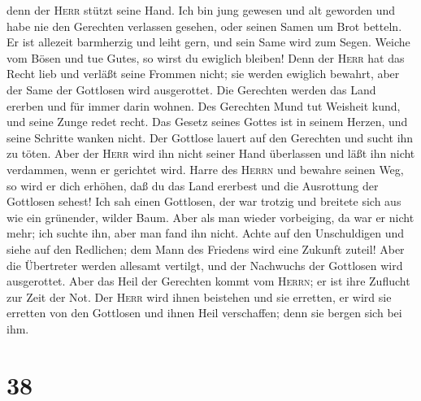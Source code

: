 denn der \textsc{Herr} stützt seine Hand.  Ich bin jung
gewesen und alt geworden und habe nie den Gerechten verlassen gesehen,
oder seinen Samen um Brot betteln.  Er ist allezeit
barmherzig und leiht gern, und sein Same wird zum Segen. 
Weiche vom Bösen und tue Gutes, so wirst du ewiglich bleiben!
 Denn der \textsc{Herr} hat das Recht lieb und verläßt
seine Frommen nicht; sie werden ewiglich bewahrt, aber der Same der
Gottlosen wird ausgerottet.  Die Gerechten werden das
Land ererben und für immer darin wohnen.  Des Gerechten
Mund tut Weisheit kund, und seine Zunge redet recht.  Das
Gesetz seines Gottes ist in seinem Herzen, und seine Schritte wanken
nicht.  Der Gottlose lauert auf den Gerechten und sucht
ihn zu töten.  Aber der \textsc{Herr} wird ihn nicht
seiner Hand überlassen und läßt ihn nicht verdammen, wenn er gerichtet
wird.  Harre des \textsc{Herrn} und bewahre seinen Weg,
so wird er dich erhöhen, daß du das Land ererbest und die Ausrottung der
Gottlosen sehest!  Ich sah einen Gottlosen, der war
trotzig und breitete sich aus wie ein grünender, wilder Baum.
 Aber als man wieder vorbeiging, da war er nicht mehr;
ich suchte ihn, aber man fand ihn nicht.  Achte auf den
Unschuldigen und siehe auf den Redlichen; dem Mann des Friedens wird
eine Zukunft zuteil!  Aber die Übertreter werden allesamt
vertilgt, und der Nachwuchs der Gottlosen wird ausgerottet.
 Aber das Heil der Gerechten kommt vom \textsc{Herrn}; er
ist ihre Zuflucht zur Zeit der Not.  Der \textsc{Herr}
wird ihnen beistehen und sie erretten, er wird sie erretten von den
Gottlosen und ihnen Heil verschaffen; denn sie bergen sich bei ihm.

\hypertarget{section-37}{%
\section{38}\label{section-37}}

